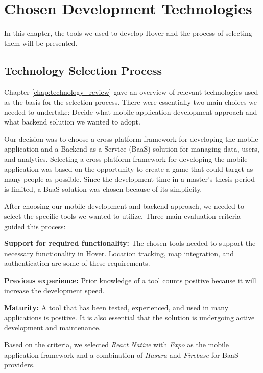 \section{Chosen Development Technologies}
\label{chap:chosen_dev_technologies}
In this chapter, the tools we used to develop Hover and the process of selecting them will be presented.

\subsection{Technology Selection Process}
Chapter \ref{chap:technology_review} gave an overview of relevant technologies used as the basis for the selection process. There were essentially two main choices we needed to undertake: Decide what mobile application development approach and what backend solution we wanted to adopt.

Our decision was to choose a cross-platform framework for developing the mobile application and a Backend as a Service (BaaS) solution for managing data, users, and analytics. Selecting a cross-platform framework for developing the mobile application was based on the opportunity to create a game that could target as many people as possible. Since the development time in a master’s thesis period is limited, a BaaS solution was chosen because of its simplicity.

After choosing our mobile development and backend approach, we needed to select the specific tools we wanted to utilize. Three main evaluation criteria guided this process:

\textbf{Support for required functionality:} The chosen tools needed to support the necessary functionality in Hover. Location tracking, map integration, and authentication are some of these requirements.

\textbf{Previous experience:} Prior knowledge of a tool counts positive because it will increase the development speed. 

\textbf{Maturity:} A tool that has been tested, experienced, and used in many applications is positive. It is also essential that the solution is undergoing active development and maintenance.

Based on the criteria, we selected \textit{React Native} with \textit{Expo} as the mobile application framework and a combination of \textit{Hasura} and \textit{Firebase} for BaaS providers. 

